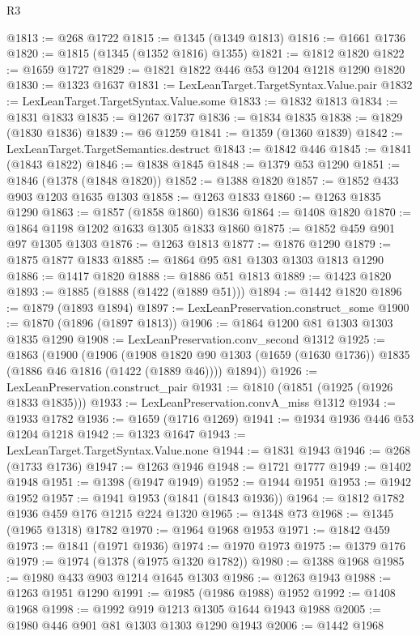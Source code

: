 \begin{lexlean}{R3}
\begin{coremodule}
@1813 := @268 @1722
@1815 := @1345 (@1349 @1813)
@1816 := @1661 @1736
@1820 := @1815 (@1345 (@1352 @1816) @1355)
@1821 := @1812 @1820
@1822 := @1659 @1727
@1829 := @1821 @1822 @446 @53 @1204 @1218 @1290 @1820
@1830 := @1323 @1637
@1831 := LexLeanTarget.TargetSyntax.Value.pair
@1832 := LexLeanTarget.TargetSyntax.Value.some
@1833 := @1832 @1813
@1834 := @1831 @1833
@1835 := @1267 @1737
@1836 := @1834 @1835
@1838 := @1829 (@1830 @1836)
@1839 := @6 @1259
@1841 := @1359 (@1360 @1839)
@1842 := LexLeanTarget.TargetSemantics.destruct
@1843 := @1842 @446
@1845 := @1841 (@1843 @1822)
@1846 := @1838 @1845
@1848 := @1379 @53 @1290
@1851 := @1846 (@1378 (@1848 @1820))
@1852 := @1388 @1820
@1857 := @1852 @433 @903 @1203 @1635 @1303
@1858 := @1263 @1833
@1860 := @1263 @1835 @1290
@1863 := @1857 (@1858 @1860) @1836
@1864 := @1408 @1820
@1870 := @1864 @1198 @1202 @1633 @1305 @1833 @1860
@1875 := @1852 @459 @901 @97 @1305 @1303
@1876 := @1263 @1813
@1877 := @1876 @1290
@1879 := @1875 @1877 @1833
@1885 := @1864 @95 @81 @1303 @1303 @1813 @1290
@1886 := @1417 @1820
@1888 := @1886 @51 @1813
@1889 := @1423 @1820
@1893 := @1885 (@1888 (@1422 (@1889 @51)))
@1894 := @1442 @1820
@1896 := @1879 (@1893 @1894)
@1897 := LexLeanPreservation.construct_some
@1900 := @1870 (@1896 (@1897 @1813))
@1906 := @1864 @1200 @81 @1303 @1303 @1835 @1290
@1908 := LexLeanPreservation.conv_second @1312
@1925 := @1863
    (@1900
      (@1906
        (@1908 @1820 @90 @1303 (@1659 (@1630 @1736)) @1835 (@1886 @46 @1816 (@1422 (@1889 @46))))
        @1894))
@1926 := LexLeanPreservation.construct_pair
@1931 := @1810 (@1851 (@1925 (@1926 @1833 @1835)))
@1933 := LexLeanPreservation.convA_miss @1312
@1934 := @1933 @1782
@1936 := @1659 (@1716 @1269)
@1941 := @1934 @1936 @446 @53 @1204 @1218
@1942 := @1323 @1647
@1943 := LexLeanTarget.TargetSyntax.Value.none
@1944 := @1831 @1943
@1946 := @268 (@1733 @1736)
@1947 := @1263 @1946
@1948 := @1721 @1777
@1949 := @1402 @1948
@1951 := @1398 (@1947 @1949)
@1952 := @1944 @1951
@1953 := @1942 @1952
@1957 := @1941 @1953 (@1841 (@1843 @1936))
@1964 := @1812 @1782 @1936 @459 @176 @1215 @224 @1320
@1965 := @1348 @73
@1968 := @1345 (@1965 @1318) @1782
@1970 := @1964 @1968 @1953
@1971 := @1842 @459
@1973 := @1841 (@1971 @1936)
@1974 := @1970 @1973
@1975 := @1379 @176
@1979 := @1974 (@1378 (@1975 @1320 @1782))
@1980 := @1388 @1968
@1985 := @1980 @433 @903 @1214 @1645 @1303
@1986 := @1263 @1943
@1988 := @1263 @1951 @1290
@1991 := @1985 (@1986 @1988) @1952
@1992 := @1408 @1968
@1998 := @1992 @919 @1213 @1305 @1644 @1943 @1988
@2005 := @1980 @446 @901 @81 @1303 @1303 @1290 @1943
@2006 := @1442 @1968

\end{coremodule}
\end{lexlean}
